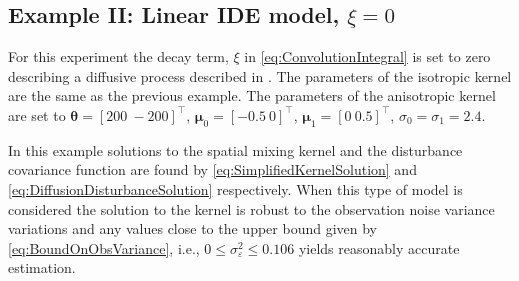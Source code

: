 \documentclass[10pt,twocolumn,twoside]{IEEEtran}
\begin{document}
\subsection{Example II: Linear IDE model, $\xi=0$}
For this experiment the decay term, $\xi$ in \eqref{eq:ConvolutionIntegral} is set to zero describing a diffusive process described in \cite{Kot1992,Kot1996,Wikle1999,Xu2005}.
The parameters of the isotropic kernel are the same as the previous example.
The parameters of the anisotropic kernel are set to $\boldsymbol\theta=[200~-200]^{\top}$, $\boldsymbol\mu_0=[-0.5~0]^{\top}$, $\boldsymbol\mu_1=[0~0.5]^{\top}$, $\sigma_0=\sigma_1=2.4$.

In this example solutions to the spatial mixing kernel and the disturbance covariance function are found by \eqref{eq:SimplifiedKernelSolution}   and \eqref{eq:DiffusionDisturbanceSolution} respectively.
When this type of model is considered the solution to the kernel is robust to the observation noise variance variations and any values close to the upper bound given by \eqref{eq:BoundOnObsVariance}, i.e., 
$0\le\sigma_{\varepsilon}^2\le 0.106$ yields reasonably accurate estimation.
\end{document}
